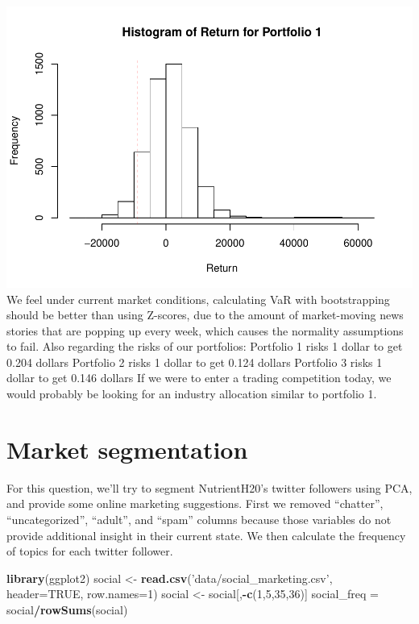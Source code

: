 \documentclass[]{article}
\newenvironment{Shaded}{\begin{snugshade}}{\end{snugshade}}
\newcommand{\DataTypeTok}[1]{\textcolor[rgb]{0.13,0.29,0.53}{#1}}
\newcommand{\DecValTok}[1]{\textcolor[rgb]{0.00,0.00,0.81}{#1}}
\newcommand{\KeywordTok}[1]{\textcolor[rgb]{0.13,0.29,0.53}{\textbf{#1}}}
\newcommand{\NormalTok}[1]{#1}
\newcommand{\OperatorTok}[1]{\textcolor[rgb]{0.81,0.36,0.00}{\textbf{#1}}}
\newcommand{\OtherTok}[1]{\textcolor[rgb]{0.56,0.35,0.01}{#1}}
\newcommand{\StringTok}[1]{\textcolor[rgb]{0.31,0.60,0.02}{#1}}
\begin{document}
\includegraphics{STA380_exercise_George_files/figure-latex/unnamed-chunk-17-1.pdf}
We feel under current market conditions, calculating VaR with
bootstrapping should be better than using Z-scores, due to the amount of
market-moving news stories that are popping up every week, which causes
the normality assumptions to fail. Also regarding the risks of our
portfolios: Portfolio 1 risks 1 dollar to get 0.204 dollars Portfolio 2
risks 1 dollar to get 0.124 dollars Portfolio 3 risks 1 dollar to get
0.146 dollars If we were to enter a trading competition today, we would
probably be looking for an industry allocation similar to portfolio 1.

\hypertarget{market-segmentation}{%
\section{Market segmentation}\label{market-segmentation}}

For this question, we'll try to segment NutrientH20's twitter followers
using PCA, and provide some online marketing suggestions. First we
removed ``chatter'', ``uncategorized'', ``adult'', and ``spam'' columns
because those variables do not provide additional insight in their
current state. We then calculate the frequency of topics for each
twitter follower.

\begin{Shaded}
\begin{Highlighting}[]
\KeywordTok{library}\NormalTok{(ggplot2)}
\NormalTok{social <-}\StringTok{ }\KeywordTok{read.csv}\NormalTok{(}\StringTok{'data/social_marketing.csv'}\NormalTok{, }\DataTypeTok{header=}\OtherTok{TRUE}\NormalTok{, }\DataTypeTok{row.names=}\DecValTok{1}\NormalTok{)}
\NormalTok{social <-}\StringTok{ }\NormalTok{social[,}\OperatorTok{-}\KeywordTok{c}\NormalTok{(}\DecValTok{1}\NormalTok{,}\DecValTok{5}\NormalTok{,}\DecValTok{35}\NormalTok{,}\DecValTok{36}\NormalTok{)]}
\NormalTok{social_freq =}\StringTok{ }\NormalTok{social}\OperatorTok{/}\KeywordTok{rowSums}\NormalTok{(social)}
\end{Highlighting}
\end{Shaded}
\end{document}
